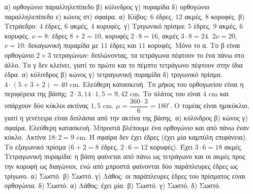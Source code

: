  α) ορθογώνιο παραλληλεπίπεδο \quad β) κύλινδρος \quad γ) πυραμίδα \quad δ) ορθογώνιο παραλληλεπίπεδο \quad ε) κώνος \quad στ) σφαίρα.
 α) Κύβος: $6$ έδρες, $12$ ακμές, $8$ κορυφές. \quad β) Τετράεδρο: $4$ έδρες, $6$ ακμές, $4$ κορυφές. \quad γ) Τριγωνικό πρίσμα: $5$ έδρες, $9$ ακμές, $6$ κορυφές.
 $\nu=8$: έδρες $8+2=10$, κορυφές $2\cdot8=16$, ακμές $3\cdot8=24$.
 $2\nu=20$, $\nu=10$: δεκαγωνική πυραμίδα με $11$ έδρες και $11$ κορυφές.
 Μόνο το α. Το β είναι ορθογώνιο $2\times3$ τετραγώνων: διπλώνοντας, τα τετράγωνα πέφτουν το ένα πάνω στο άλλο. Το γ δεν κλείνει, γιατί το πρώτο και το πέμπτο τετράγωνο πέφτουν στην ίδια έδρα.
 α) κύλινδρος \quad β) κώνος \quad γ) τετραγωνική πυραμίδα \quad δ) τριγωνικό πρίσμα.
 $4\cdot(5+3+2)=40$ cm.
 Ελεύθερη κατασκευή. Το μήκος του ορθογωνίου είναι η περιφέρεια της βάσης: $2\cdot3{,}14\cdot1{,}5=9{,}42$ cm. Το πλάτος του είναι $4$ cm και υπάρχουν δύο κύκλοι ακτίνας $1{,}5$ cm.
 $\mu=\dfrac{360\cdot3}{6}=180^\circ$. Ο τομέας είναι ημικύκλιο, γιατί η γενέτειρα είναι διπλάσια από την ακτίνα της βάσης.
 α) κύλινδρος \quad β) κώνος \quad γ) σφαίρα.
 Ελεύθερη κατασκευή. Μπροστά βλέπουμε ένα ορθογώνιο και από πάνω έναν κύκλο.
 Ακτίνα $18:2=9$ cm. Η σφαίρα δεν έχει έδρες (έχει μία καμπύλη επιφάνεια).
 Το εξαγωνικό πρίσμα ($6+2=8$ έδρες, $2\cdot6=12$ κορυφές). Έχει $3\cdot6=18$ ακμές.
 Τετραγωνική πυραμίδα: η βάση φαίνεται από πάνω ως τετράγωνο και οι ακμές προς την κορυφή ως διαγώνιοι, ενώ από μπροστά φαίνονται δύο παράπλευρες έδρες ως τρίγωνο.
 α) Σωστό. \quad β) Σωστό. \quad γ) Λάθος: οι παράπλευρες έδρες του πρίσματος είναι ορθογώνια. \quad δ) Σωστό.
 α) Λάθος: έχει μία. \quad β) Σωστό. \quad γ) Σωστό. \quad δ) Σωστό.
